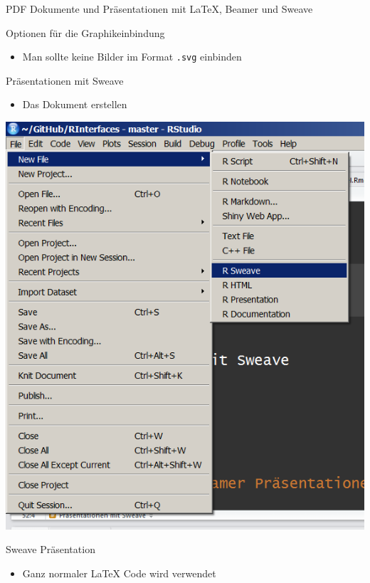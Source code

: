 \documentclass[ignorenonframetext,]{beamer}
\providecommand{\tightlist}{%
\setlength{\itemsep}{0pt}\setlength{\parskip}{0pt}}
\begin{document}
\begin{frame}[fragile]{PDF Dokumente und Präsentationen mit LaTeX,
Beamer und Sweave}
\begin{block}{Optionen für die Graphikeinbindung}
\begin{itemize}
\tightlist
\item
  Man sollte keine Bilder im Format \texttt{.svg} einbinden
\end{itemize}

\end{block}

\begin{block}{Präsentationen mit Sweave}

\begin{itemize}
\tightlist
\item
  Das Dokument erstellen
\end{itemize}

\includegraphics{./tex2pdf.9796/eec89c723aaf72023735cae9394dd2ecd7c8fded.png}

\end{block}

\begin{block}{Sweave Präsentation}

\begin{itemize}
\tightlist
\item
  Ganz normaler LaTeX Code wird verwendet
\end{itemize}


\end{block}
\end{frame}
\end{document}
